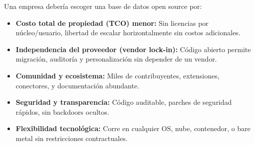 Una empresa debería escoger una base de datos open source por:

\begin{itemize}
    \item \textbf{Costo total de propiedad (TCO) menor:} Sin licencias por núcleo/usuario, libertad de escalar horizontalmente sin costos adicionales.
    \item \textbf{Independencia del proveedor (vendor lock-in):} Código abierto permite migración, auditoría y personalización sin depender de un vendor.
    \item \textbf{Comunidad y ecosistema:} Miles de contribuyentes, extensiones, conectores, y documentación abundante.
    \item \textbf{Seguridad y transparencia:} Código auditable, parches de seguridad rápidos, sin backdoors ocultos.
    \item \textbf{Flexibilidad tecnológica:} Corre en cualquier OS, nube, contenedor, o bare metal sin restricciones contractuales.
\end{itemize}